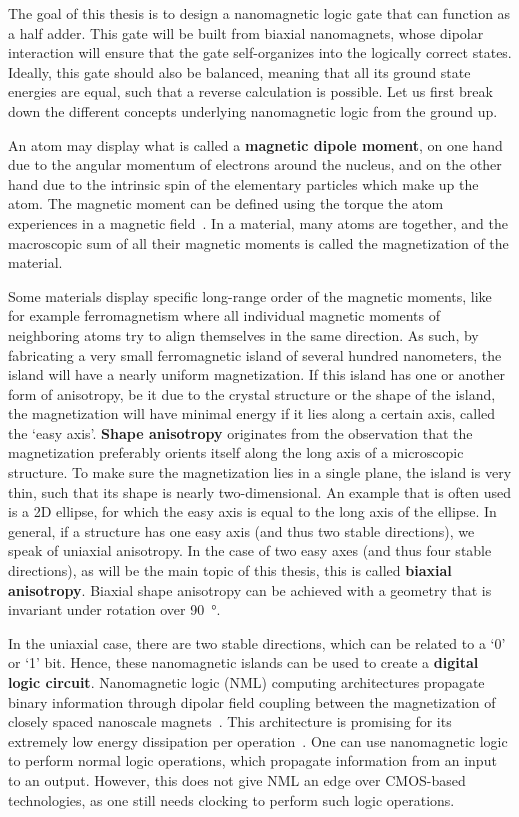 \documentclass[11pt,a4paper,english]{article}
\begin{document}
\noindent The goal of this thesis is to design a nanomagnetic logic gate that can function as a half adder. This gate will be built from biaxial nanomagnets, whose dipolar interaction will ensure that the gate self-organizes into the logically correct states. Ideally, this gate should also be balanced, meaning that all its ground state energies are equal, such that a reverse calculation is possible. Let us first break down the different concepts underlying nanomagnetic logic from the ground up. \par
An atom may display what is called a \textbf{magnetic dipole moment}, on one hand due to the angular momentum of electrons around the nucleus, and on the other hand due to the intrinsic spin of the elementary particles which make up the atom. The magnetic moment can be defined using the torque the atom experiences in a magnetic field~\cite{IntroMagneticMaterials}. In a material, many atoms are together, and the macroscopic sum of all their magnetic moments is called the magnetization of the material. \par
Some materials display specific long-range order of the magnetic moments, like for example ferromagnetism where all individual magnetic moments of neighboring atoms try to align themselves in the same direction. As such, by fabricating a very small ferromagnetic island of several hundred nanometers, the island will have a nearly uniform magnetization. If this island has one or another form of anisotropy, be it due to the crystal structure or the shape of the island, the magnetization will have minimal energy if it lies along a certain axis, called the `easy axis'. \textbf{Shape anisotropy} originates from the observation that the magnetization preferably orients itself along the long axis of a microscopic structure. To make sure the magnetization lies in a single plane, the island is very thin, such that its shape is nearly two-dimensional. An example that is often used is a 2D ellipse, for which the easy axis is equal to the long axis of the ellipse. In general, if a structure has one easy axis (and thus two stable directions), we speak of uniaxial anisotropy. In the case of two easy axes (and thus four stable directions), as will be the main topic of this thesis, this is called \textbf{biaxial anisotropy}. Biaxial shape anisotropy can be achieved with a geometry that is invariant under rotation over \SI{90}{\degree}. \par
In the uniaxial case, there are two stable directions, which can be related to a `0' or `1' bit. Hence, these nanomagnetic islands can be used to create a \textbf{digital logic circuit}. Nanomagnetic logic (NML) computing architectures propagate binary information through dipolar field coupling between the magnetization of closely spaced nanoscale magnets~\cite{SubnanosecondPropagation_AnisotropyChains}. This architecture is promising for its extremely low energy dissipation per operation~\cite{SubnanosecondPropagation_AnisotropyChains,FourStateLogic,MQCA_RoomTemp}. One can use nanomagnetic logic to perform normal logic operations, which propagate information from an input to an output. However, this does not give NML an edge over CMOS-based technologies, as one still needs clocking to perform such logic operations. \par 
\end{document}

